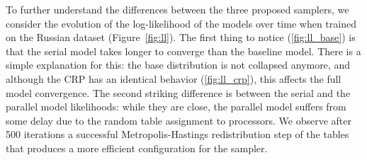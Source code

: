 To further understand the differences between the three proposed samplers, we consider the evolution of the log-likelihood of the models over time when trained on the Russian dataset (Figure~\ref{fig:ll}). The first thing to notice (\ref{fig:ll_base}) is that the serial model takes longer to converge than the baseline model. There is a simple explanation for this: the base distribution is not collapsed anymore, and although the CRP has an identical behavior (\ref{fig:ll_crp}), this affects the full model convergence. The second striking difference is between the serial and the parallel model likelihoods: while they are close, the parallel model suffers from some delay due to the random table assignment to processors. We observe after 500 iterations a successful Metropolis-Hastings redistribution step of the tables that produces a more efficient configuration for the sampler.

